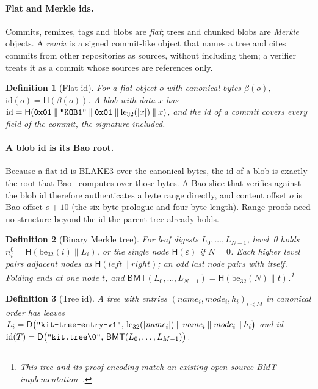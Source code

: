 \documentclass[10pt,letterpaper]{article}
\newtheorem{definition}{Definition}
\theoremstyle{remark}
\newcommand{\Hb}{\mathsf{H}}
\newcommand{\D}{\mathsf{D}}
\newcommand{\BMT}{\mathsf{BMT}}
\newcommand{\cc}{\mathbin{\|}}
\newcommand{\str}[1]{\texttt{"\romannumeral-`0#1"}}
\newcommand{\bytes}[1]{\texttt{\romannumeral-`0#1}}
\begin{document}
\paragraph{Flat and Merkle ids.}
Commits, remixes, tags and blobs are \emph{flat}; trees and chunked blobs are
\emph{Merkle} objects. A \emph{remix} is a signed commit-like object that names
a tree and cites commits from other repositories as sources, without including
them; a verifier treats it as a commit whose sources are references only.

\begin{definition}[Flat id]\label{def:flat}
For a flat object $o$ with canonical bytes $\beta(o)$,
$\mathrm{id}(o) = \Hb(\beta(o))$. A blob with data $x$ has
$\mathrm{id} = \Hb(\bytes{0x01} \cc \str{KOB1} \cc \bytes{0x01} \cc
\mathrm{le}_{32}(|x|) \cc x)$, and the id of a commit covers every field of the
commit, the signature included.
\end{definition}

\paragraph{A blob id is its Bao root.}
Because a flat id is BLAKE3 over the canonical bytes, the id of a blob is
exactly the root that Bao~\cite{bao} computes over those bytes. A Bao slice
that verifies against the blob id therefore authenticates a byte range
directly, and content offset $o$ is Bao offset $o + 10$ (the six-byte prologue
and four-byte length). Range proofs need no structure beyond the id the parent
tree already holds.

\begin{definition}[Binary Merkle tree]\label{def:bmt}
For leaf digests $L_0, \dots, L_{N-1}$, level~0 holds
$n^0_i = \Hb(\mathrm{be}_{32}(i) \cc L_i)$, or the single node
$\Hb(\varepsilon)$ if $N = 0$. Each higher level pairs adjacent nodes as
$\Hb(\mathit{left} \cc \mathit{right})$; an odd last node pairs with itself.
Folding ends at one node $t$, and
$\BMT(L_0, \dots, L_{N-1}) = \Hb(\mathrm{be}_{32}(N) \cc t)$.\footnote{This
tree and its proof encoding match an existing open-source BMT
implementation~\cite{commonware}.}
\end{definition}

\begin{definition}[Tree id]\label{def:tree}
A tree with entries $(\mathit{name}_i, \mathit{mode}_i, h_i)_{i<M}$ in
canonical order has leaves
$L_i = \D\bigl(\str{kit-tree-entry-v1},\, \mathrm{le}_{32}(|\mathit{name}_i|)
\cc \mathit{name}_i \cc \mathit{mode}_i \cc h_i\bigr)$ and id
$\mathrm{id}(T) = \D\bigl(\str{kit.tree\textbackslash 0},\, \BMT(L_0, \dots,
L_{M-1})\bigr)$.
\end{definition}
\end{document}
